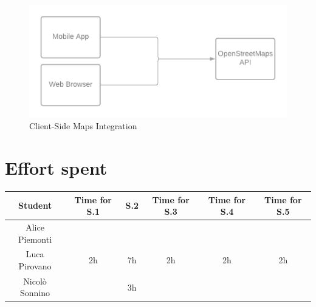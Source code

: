 \documentclass[table, 12pt]{article}
\begin{document}
\begin{center}
    \begin{figure}[H]
        \includegraphics[width=\textwidth]{assets/IT-Plan/OpenStreetMaps.png}
        \caption{Client-Side Maps Integration}
        \label{maps_api}
    \end{figure}
\end{center}


\pagestyle{plain}

\section{Effort spent}
\begin{tabular}{ | c || c | c | c | c| c|}
    \hline
    Student        & Time for S.1 & S.2 & Time for S.3 & Time for S.4 & Time for S.5 \\ \hline
    Alice Piemonti &              &     &              &              &              \\ \hline
    Luca Pirovano  & 2h           & 7h  & 2h           & 2h           & 2h           \\ \hline
    Nicolò Sonnino &              & 3h  &              &              &              \\
    \hline
\end{tabular}
\end{document}
